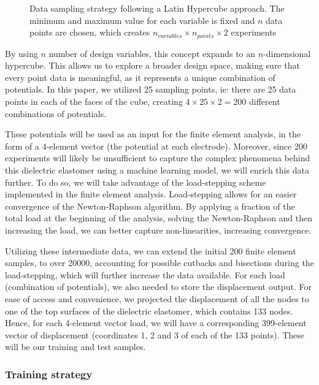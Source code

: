\begin{figure}
\begin{tikzpicture}[x=0.75pt,y=0.75pt,yscale=-1,xscale=1]
\end{tikzpicture}
\caption{Data sampling strategy following a Latin Hypercube approach. The minimum and maximum value for each variable is fixed and $n$ data points are chosen, which creates $n_{variables}\times n_{points}\times 2$ experiments}
\label{fig: hypercube}
\end{figure}



By using $n$ number of design variables, this concept expands to an $n$-dimensional hypercube. This allows us to explore a broader design space, making sure that every point data is meaningful, as it represents a unique combination of potentials. In this paper, we utilized 25 sampling points, ie: there are 25 data points in each of the faces of the cube, creating $4\times 25 \times 2=200$ different combinations of potentials.

These potentials will be used as an input for the finite element analysis, in the form of a 4-element vector (the potential at each electrode). Moreover, since 200 experiments will likely be unsufficient to capture the complex phenomena behind this dielectric elastomer using a machine learning model, we will enrich this data further. To do so, we will take advantage of the load-stepping scheme implemented in the finite element analysis. Load-stepping allows for an easier convergence of the Newton-Raphson algorithm. By applying a fraction of the total load at the beginning of the analysis, solving the Newton-Raphson and then increasing the load, we can better capture non-linearities, increasing convergence. 

Utilizing these intermediate data, we can extend the initial 200 finite element samples, to over 20000, accounting for possible cutbacks and bisections during the load-stepping, which will further increase the data available. For each load (combination of potentials), we also needed to store the displacement output. For ease of access and convenience, we projected the displacement of all the nodes to one of the top surfaces of the dielectric elastomer, which contains 133 nodes. Hence, for each 4-element vector load, we will have a corresponding 399-element vector of displacement (coordinates 1, 2 and 3 of each of the 133 points). These will be our training and test samples.


\subsubsection{Training strategy}

